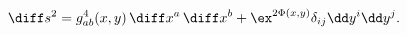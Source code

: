 \begin{equation}
   \diff s^2 = g^4_{ab}(x,y)\,\diff x^a \,\diff x^b 
       + \ex^{2\Phi(x,y)} \delta_{ij}\dd y^i \dd y^j .
\label{fourtwometric} 
\end{equation}

